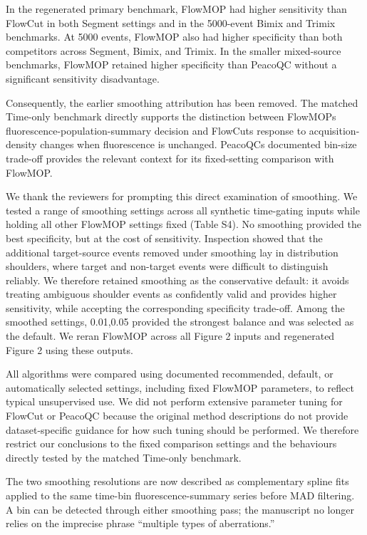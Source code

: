 \documentclass[
  11pt,
  a4paper,
]{article}
\begin{document}
In the regenerated primary benchmark, FlowMOP had higher sensitivity
than FlowCut in both Segment settings and in the 5000-event Bimix and
Trimix benchmarks. At 5000 events, FlowMOP also had higher specificity
than both competitors across Segment, Bimix, and Trimix. In the smaller
mixed-source benchmarks, FlowMOP retained higher specificity than
PeacoQC without a significant sensitivity disadvantage.

Consequently, the earlier smoothing attribution has been removed. The
matched Time-only benchmark directly supports the distinction between
FlowMOP\textquotesingle s fluorescence-population-summary decision and
FlowCut\textquotesingle s response to acquisition-density changes when
fluorescence is unchanged. PeacoQC\textquotesingle s documented bin-size
trade-off provides the relevant context for its fixed-setting comparison
with FlowMOP.

We thank the reviewers for prompting this direct examination of
smoothing. We tested a range of smoothing settings across all synthetic
time-gating inputs while holding all other FlowMOP settings fixed (Table
S4). No smoothing provided the best specificity, but at the cost of
sensitivity. Inspection showed that the additional target-source events
removed under smoothing lay in distribution shoulders, where target and
non-target events were difficult to distinguish reliably. We therefore
retained smoothing as the conservative default: it avoids treating
ambiguous shoulder events as confidently valid and provides higher
sensitivity, while accepting the corresponding specificity trade-off.
Among the smoothed settings, 0.01,0.05 provided the strongest balance
and was selected as the default. We reran FlowMOP across all Figure 2
inputs and regenerated Figure 2 using these outputs.

All algorithms were compared using documented recommended, default, or
automatically selected settings, including fixed FlowMOP parameters, to
reflect typical unsupervised use. We did not perform extensive parameter
tuning for FlowCut or PeacoQC because the original method descriptions
do not provide dataset-specific guidance for how such tuning should be
performed. We therefore restrict our conclusions to the fixed comparison
settings and the behaviours directly tested by the matched Time-only
benchmark.

The two smoothing resolutions are now described as complementary spline
fits applied to the same time-bin fluorescence-summary series before MAD
filtering. A bin can be detected through either smoothing pass; the
manuscript no longer relies on the imprecise phrase ``multiple types of
aberrations.''
\end{document}
